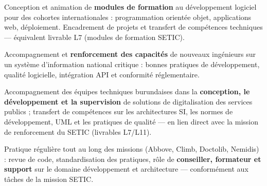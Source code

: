 \newpage
{}

\cvgroupreset

\begin{cvgroup}

\begin{cvprojectsummary}
Conception et animation de \textbf{modules de formation} au développement logiciel pour des cohortes internationales : programmation orientée objet, applications web, déploiement. Encadrement de projets et transfert de compétences techniques — équivalent livrable L7 (modules de formation SETIC).
\end{cvprojectsummary}
\end{cvgroup}

\begin{cvgroup}

\begin{cvprojectsummary}
Accompagnement et \textbf{renforcement des capacités} de nouveaux ingénieurs sur un système d'information national critique : bonnes pratiques de développement, qualité logicielle, intégration API et conformité réglementaire.
\end{cvprojectsummary}
\end{cvgroup}

\begin{cvgroup}

\begin{cvprojectsummary}
Accompagnement des équipes techniques burundaises dans la \textbf{conception, le développement et la supervision} de solutions de digitalisation des services publics ; transfert de compétences sur les architectures SI, les normes de développement, UML et les pratiques de qualité — en lien direct avec la mission de renforcement du SETIC (livrables L7/L11).
\end{cvprojectsummary}
\end{cvgroup}

\begin{cvgroup}

\begin{cvprojectsummary}
Pratique régulière tout au long des missions (Abbove, Climb, Doctolib, Nemidis) : revue de code, standardisation des pratiques, rôle de \textbf{conseiller, formateur et support} sur le domaine développement et architecture — conformément aux tâches de la mission SETIC.
\end{cvprojectsummary}
\end{cvgroup}
